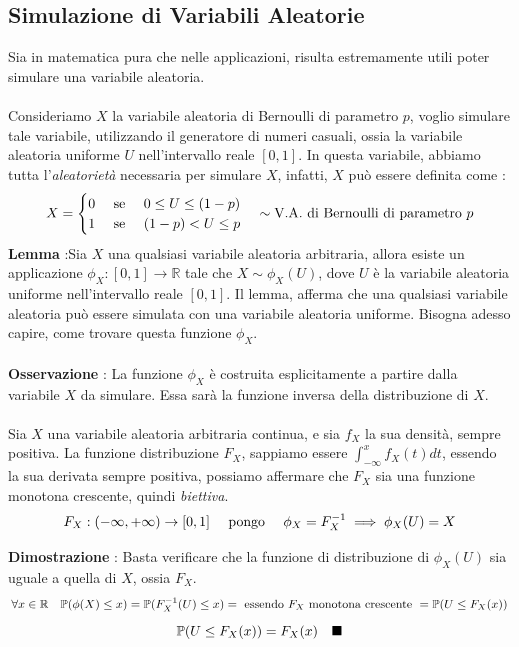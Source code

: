 \documentclass[12pt, letterpaper]{article}
\newcommand{\R}{{\mathbb R}}
\newcommand{\acc}{\\\hphantom{}\\}
\newcommand{\Prob}{{\mathbb P}}
\newcommand{\spaz}{{\text{\hphantom{aa}}}}
\begin{document}
\subsection{Simulazione di Variabili Aleatorie}
Sia in matematica pura che nelle applicazioni, risulta estremamente utili poter simulare una variabile 
aleatoria.\acc Consideriamo \(X\) la variabile aleatoria di Bernoulli di parametro \(p\), voglio 
simulare tale variabile, utilizzando il generatore di numeri casuali, ossia la variabile aleatoria 
uniforme \(U\) nell'intervallo reale \([0,1]\). In questa variabile, abbiamo tutta l'\textit{aleatorietà}
necessaria per simulare \(X\), infatti, \(X\) può essere definita come : $$X=\begin{cases}
    0\spaz\text{ se }\spaz 0\le U\le(1-p)\\
    1\spaz\text{ se }\spaz (1-p)<U\le p
\end{cases}\sim \text{V.A. di Bernoulli di parametro }p$$
\textbf{Lemma} :Sia \(X\) una qualsiasi variabile aleatoria arbitraria, allora 
esiste un applicazione \(\phi_X:[0,1]\rightarrow\R\) tale che \(X\sim\phi_X(U)\), dove \(U\) è la variabile aleatoria 
uniforme nell'intervallo  reale \([0,1]\). 
Il lemma, afferma che una qualsiasi variabile aleatoria può essere simulata con una variabile aleatoria uniforme. Bisogna 
adesso capire, come trovare questa funzione \(\phi_X\).\acc 
\textbf{Osservazione} : La funzione \(\phi_X\) è costruita esplicitamente a partire dalla variabile \(X\) da simulare. Essa 
sarà la funzione inversa della distribuzione di \(X\).\acc 
Sia \(X\) una variabile aleatoria arbitraria continua, e sia \(f_X\) la sua densità, sempre positiva. La funzione 
distribuzione \(F_X\), sappiamo essere \(\int_{-\infty}^xf_X(t)dt\), essendo la sua derivata 
sempre positiva, possiamo affermare che \(F_X\) sia una funzione monotona crescente, quindi \textit{biettiva}.$$
F_X:(-\infty,+\infty)\rightarrow [0,1]\spaz\text{ pongo }\spaz\phi_X=F_X^{-1}\implies\phi_X(U)=X $$\begin{figure}[h]
\end{figure}
\newpage\textbf{Dimostrazione }: Basta verificare che la funzione di distribuzione di \(\phi_X(U)\) sia uguale a quella 
di \(X\), ossia \(F_X\).$$
    \forall x\in \R\spaz\Prob(\phi(X)\le x)=\Prob(F_X^{-1}(U)\le x)=\text{ essendo }F_X\text{ monotona crescente }=\Prob(U\le F_X(x))
$$
$$
\Prob(U\le F_X(x))=F_X(x)\spaz \blacksquare
$$
\end{document}

